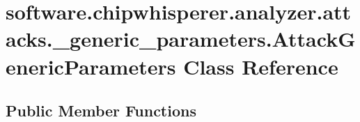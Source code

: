 \hypertarget{classsoftware_1_1chipwhisperer_1_1analyzer_1_1attacks_1_1__generic__parameters_1_1AttackGenericParameters}{}\section{software.\+chipwhisperer.\+analyzer.\+attacks.\+\_\+generic\+\_\+parameters.\+Attack\+Generic\+Parameters Class Reference}
\label{classsoftware_1_1chipwhisperer_1_1analyzer_1_1attacks_1_1__generic__parameters_1_1AttackGenericParameters}
\subsection*{Public Member Functions}

